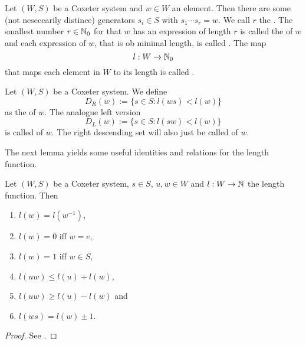 \begin{defi}
	Let $(W,S)$ be a Coxeter system and $w \in W$ an element. Then there are some (not neseccarily distince) generators $s_i \in S$ with $s_1 \cdots s_r = w$. We call $r$ the . The smallest number $r \in \mathbb{N}_0$ for that $w$ has an expression of length $r$ is called the  of $w$ and each expression of $w$, that is ob minimal length, is called . The map
	$$ l : W \to \mathbb{N}_0 $$
	that maps each element in $W$ to its length is called .
\end{defi}

\begin{defi}
	Let $(W,S)$ be a Coxeter system. We define
	$$ D_R(w) := \{ s \in S : l(ws) < l(w) \} $$
	as the  of $w$. The analogue left version
	$$ D_L(w) := \{ s \in S : l(sw) < l(w) \} $$
	is called  of $w$. The right descending set will also just be called  of $w$.
\end{defi}

The next lemma yields some useful identities and relations for the length function.

\begin{lemm}
	Let $(W,S)$ be a Coxeter system, $s \in S$, $u, w \in W$ and $l : W \to \mathbb{N}$ the length function. Then
	\begin{enumerate}
		\item $l(w) = l(w^{-1})$,
		\item $l(w) = 0$ iff $w = e$,
		\item $l(w) = 1$ iff $w \in S$,
		\item $l(uw) \leq l(u) + l(w)$,
		\item $l(uw) \geq l(u) - l(w)$ and
		\item $l(ws) = l(w) \pm 1$.
	\end{enumerate}

	\begin{proof}
		See \cite[Section 5.2]{humphreys:coxeter}.
	\end{proof}
\end{lemm}